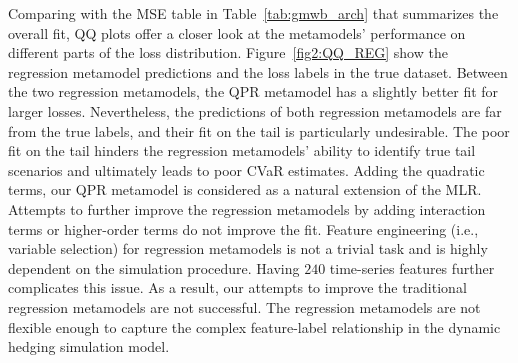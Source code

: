 Comparing with the MSE table in Table~\ref{tab:gmwb_arch} that summarizes the overall fit, QQ plots offer a closer look at the metamodels' performance on different parts of the loss distribution.
Figure~\ref{fig2:QQ_REG} show the regression metamodel predictions and the loss labels in the true dataset.
Between the two regression metamodels, the QPR metamodel has a slightly better fit for larger losses.
Nevertheless, the predictions of both regression metamodels are far from the true labels, and their fit on the tail is particularly undesirable.
The poor fit on the tail hinders the regression metamodels' ability to identify true tail scenarios and ultimately leads to poor CVaR estimates.
Adding the quadratic terms, our QPR metamodel is considered as a natural extension of the MLR.
Attempts to further improve the regression metamodels by adding interaction terms or higher-order terms do not improve the fit.
Feature engineering (i.e., variable selection) for regression metamodels is not a trivial task and is highly dependent on the simulation procedure. 
Having $240$ time-series features further complicates this issue.
As a result, our attempts to improve the traditional regression metamodels are not successful.
The regression metamodels are not flexible enough to capture the complex feature-label relationship in the dynamic hedging simulation model.


